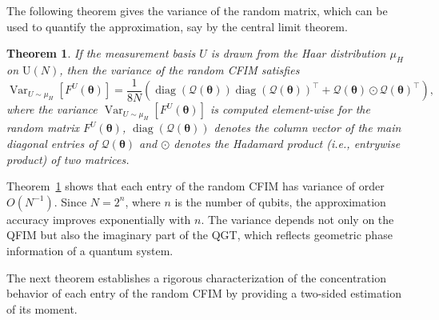 \documentclass{amsart}
\theoremstyle{plain}
\newtheorem{theorem}{Theorem}
\theoremstyle{definition}
\theoremstyle{remark}
\newcommand{\thmref}[1]{Theorem~\ref{#1}}
\DeclareMathOperator{\var}{Var}
\begin{document}
The following theorem gives the variance of the random matrix, which can be used to quantify the approximation, say by the central limit theorem.
\begin{theorem}
    \label{2}
     If the measurement basis $U$ is drawn from the Haar distribution $\mu_H$ on $\mathrm U(N)$, then the variance of the random CFIM satisfies 
     \begin{equation}
         \var_{U\sim\mu_H}[F^U(\bm\theta)]=\frac{1}{8N}\left(\operatorname{diag}(\mathcal{Q}(\bm\theta))\operatorname{diag}(\mathcal{Q}(\bm\theta))^\top+\mathcal{Q}(\bm\theta)\odot\mathcal{Q}(\bm\theta)^\top\right),
     \end{equation}
     where the variance $\var_{U\sim\mu_H}[F^U(\bm\theta)]$ is computed  element-wise for the random matrix $F^U(\bm\theta)$, $\operatorname{diag}(\mathcal{Q}(\bm\theta))$ denotes the column vector of the main diagonal entries of $\mathcal{Q}(\bm\theta)$ and  $\odot$ denotes the Hadamard product (i.e., entrywise product) of two matrices.
\end{theorem}
\thmref{2} shows that each entry of the random CFIM has variance of order  $O(N^{-1})$. Since $N=2^n$, where $n$ is the number of qubits, the approximation accuracy improves exponentially with $n$. The variance depends not only on the QFIM but also the imaginary part of the QGT, which reflects geometric phase information of a quantum system.    


   The next theorem establishes a rigorous characterization of the concentration behavior of each entry of the random CFIM by providing a two-sided estimation of its moment.
\end{document}
